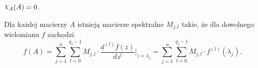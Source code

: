 \begin{theorem}
  $\goodchi_A(A) = 0$.
\end{theorem}

\begin{theorem}
  Dla każdej macierzy $A$ istnieją macierze spektralne $M_{j,l}$ takie, że dla dowolnego
  wielomianu $f$ zachodzi
  \[
    f(A) = \sum_{j=1}^{n} \sum_{l=0}^{q_j - 1} M_{j,l} \cdot
    \frac{d^{(l)} f(z)}{dz^l} \bigg\vert_{z = \lambda_j} =
    \sum_{j=1}^{n} \sum_{l=0}^{q_j - 1} M_{j,l} \cdot f^{(l)}(\lambda_j).
  \]
\end{theorem}





















